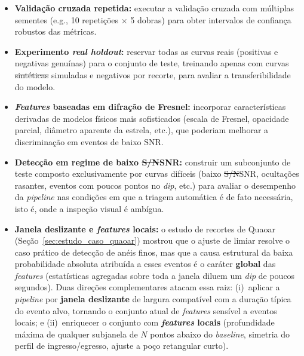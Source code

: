 \documentclass[msc]{on} %
\makeatletter
\providecommand{\DIFaddtex}[1]{{\protect\color{red}#1}} %
\providecommand{\DIFdeltex}[1]{{\protect\color{red}\sout{#1}}} %
\providecommand{\DIFaddbegin}{} %
\providecommand{\DIFaddend}{} %
\providecommand{\DIFdelbegin}{} %
\providecommand{\DIFdelend}{} %
\providecommand{\DIFadd}[1]{\texorpdfstring{\DIFaddtex{#1}}{#1}} %
\providecommand{\DIFdel}[1]{\texorpdfstring{\DIFdeltex{#1}}{}} %
\let\sout@orig\sout %
\renewcommand{\sout}[1]{\ifmmode\text{\sout@orig{\ensuremath{#1}}}\else\sout@orig{#1}\fi} %
\makeatother
\begin{document}
\begin{itemize}
	\item \textbf{Validação cruzada repetida:} executar a validação cruzada com múltiplas sementes (e.g., 10 repetições $\times$ 5 dobras) para obter intervalos de confiança robustos das métricas.

	\item \textbf{Experimento \textit{real holdout}:} reservar todas as curvas reais (positivas e negativas genuínas) para o conjunto de teste, treinando apenas com curvas \DIFdelbegin \DIFdel{sintéticas }\DIFdelend \DIFaddbegin \DIFadd{simuladas }\DIFaddend e negativos por recorte, para avaliar a transferibilidade do modelo.

	\item \textbf{\textit{Features} baseadas em difração de Fresnel:} incorporar características derivadas de modelos físicos mais sofisticados (escala de Fresnel, opacidade parcial, diâmetro aparente da estrela\DIFaddbegin \DIFadd{, etc.}\DIFaddend ), que poderiam melhorar a discriminação em eventos de baixo SNR.

	\item \textbf{Detecção em regime de baixo \DIFdelbegin \DIFdel{S/N}\DIFdelend \DIFaddbegin \DIFadd{SNR}\DIFaddend :} construir um subconjunto de teste composto exclusivamente por curvas difíceis (baixo \DIFdelbegin \DIFdel{S/N}\DIFdelend \DIFaddbegin \DIFadd{SNR}\DIFaddend , ocultações rasantes, eventos com poucos pontos no \textit{dip}\DIFaddbegin \DIFadd{, etc.}\DIFaddend ) para avaliar o desempenho da \textit{pipeline} nas condições em que a triagem automática é de fato necessária, isto é, onde a inspeção visual é ambígua.

	\item \textbf{Janela deslizante e \textit{features} locais:} o estudo de recortes de Quaoar (Seção~\ref{sec:estudo_caso_quaoar}) mostrou que o ajuste de limiar resolve o caso prático de detecção de anéis finos, mas que a causa estrutural da baixa probabilidade absoluta atribuída a esses eventos é o caráter \textbf{global} das \textit{features} (estatísticas agregadas sobre toda a janela diluem um \textit{dip} de poucos segundos). Duas direções complementares atacam essa raiz: (i)~aplicar a \textit{pipeline} por \textbf{janela deslizante} de largura compatível com a duração típica do evento alvo, tornando o conjunto atual de \textit{features} sensível a eventos locais; e (ii)~enriquecer o conjunto com \textbf{\textit{features} locais} (profundidade máxima de qualquer subjanela de $N$ pontos abaixo do \textit{baseline}, simetria do perfil de ingresso/egresso, ajuste a poço retangular curto).


\end{itemize}
\end{document}
